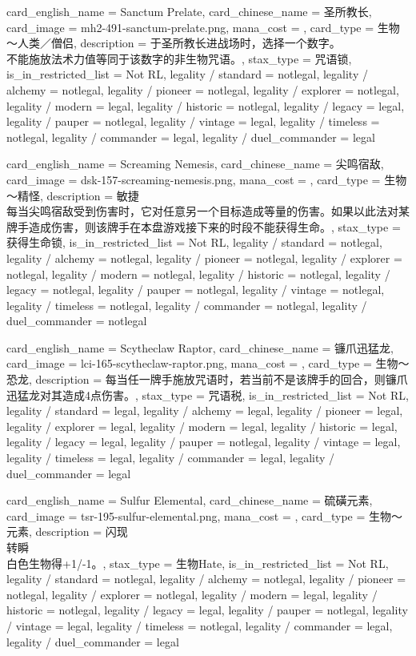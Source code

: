 \documentclass[lang = cn, color = black, 10pt]{AllThatStax}
\begin{document}
\card
{
	card_english_name = {Sanctum Prelate},
	card_chinese_name = {圣所教长},
	card_image = mh2-491-sanctum-prelate.png,
	mana_cost = ,
	card_type = 生物～人类／僧侣,
	description = {于圣所教长进战场时，选择一个数字。\\
不能施放法术力值等同于该数字的非生物咒语。},
	stax_type = 咒语锁,
	is_in_restricted_list = Not RL,
	legality / standard = notlegal,
	legality / alchemy = notlegal,
	legality / pioneer = notlegal,
	legality / explorer = notlegal,
	legality / modern = legal,
	legality / historic = notlegal,
	legality / legacy = legal,
	legality / pauper = notlegal,
	legality / vintage = legal,
	legality / timeless = notlegal,
	legality / commander = legal,
	legality / duel_commander = legal
}

\card
{
	card_english_name = {Screaming Nemesis},
	card_chinese_name = {尖鸣宿敌},
	card_image = dsk-157-screaming-nemesis.png,
	mana_cost = ,
	card_type = 生物～精怪,
	description = {敏捷\\
每当尖鸣宿敌受到伤害时，它对任意另一个目标造成等量的伤害。如果以此法对某牌手造成伤害，则该牌手在本盘游戏接下来的时段不能获得生命。},
	stax_type = 获得生命锁,
	is_in_restricted_list = Not RL,
	legality / standard = notlegal,
	legality / alchemy = notlegal,
	legality / pioneer = notlegal,
	legality / explorer = notlegal,
	legality / modern = notlegal,
	legality / historic = notlegal,
	legality / legacy = notlegal,
	legality / pauper = notlegal,
	legality / vintage = notlegal,
	legality / timeless = notlegal,
	legality / commander = notlegal,
	legality / duel_commander = notlegal
}

\card
{
	card_english_name = {Scytheclaw Raptor},
	card_chinese_name = {镰爪迅猛龙},
	card_image = lci-165-scytheclaw-raptor.png,
	mana_cost = ,
	card_type = 生物～恐龙,
	description = {每当任一牌手施放咒语时，若当前不是该牌手的回合，则镰爪迅猛龙对其造成4点伤害。},
	stax_type = 咒语税,
	is_in_restricted_list = Not RL,
	legality / standard = legal,
	legality / alchemy = legal,
	legality / pioneer = legal,
	legality / explorer = legal,
	legality / modern = legal,
	legality / historic = legal,
	legality / legacy = legal,
	legality / pauper = notlegal,
	legality / vintage = legal,
	legality / timeless = legal,
	legality / commander = legal,
	legality / duel_commander = legal
}

\card
{
	card_english_name = {Sulfur Elemental},
	card_chinese_name = {硫磺元素},
	card_image = tsr-195-sulfur-elemental.png,
	mana_cost = ,
	card_type = 生物～元素,
	description = {闪现\\
转瞬\\
白色生物得+1/-1。},
	stax_type = 生物Hate,
	is_in_restricted_list = Not RL,
	legality / standard = notlegal,
	legality / alchemy = notlegal,
	legality / pioneer = notlegal,
	legality / explorer = notlegal,
	legality / modern = legal,
	legality / historic = notlegal,
	legality / legacy = legal,
	legality / pauper = notlegal,
	legality / vintage = legal,
	legality / timeless = notlegal,
	legality / commander = legal,
	legality / duel_commander = legal
}
\end{document}
